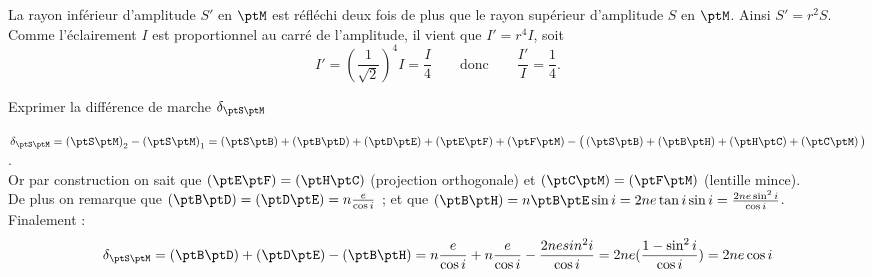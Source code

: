 \reponse{\reponseB{}}

\begin{corrige}
	La rayon inférieur d'amplitude $S'$ en $\ptM$ est réfléchi deux fois de plus que le rayon supérieur d'amplitude $S$ en $\ptM$. Ainsi $S' = r^2 S$. Comme l'éclairement $I$ est proportionnel au carré de l'amplitude, il vient que $I' = r^4 I$, soit
	$$
	I' = \left( \frac{1}{\sqrt{2}} \right)^4 I = \frac{I}{4} \qquad \text{donc} \qquad \frac{I'}{I} = \frac{1}{4}.$$
	
\end{corrige}




\begin{enonce}
Exprimer la différence de marche $\delta_{\ptS\ptM}$
\end{enonce}


\begin{corrige}
$\delta_{\ptS\ptM}=\left(\ptS\ptM\right)_2 - \left(\ptS\ptM\right)_1 = \left(\ptS\ptB\right)+\left(\ptB\ptD\right)+\left(\ptD\ptE\right)+\left(\ptE\ptF\right) + \left(\ptF\ptM\right) - \big( \left(\ptS\ptB\right) + \left(\ptB\ptH\right) + \left(\ptH\ptC\right) + \left(\ptC\ptM\right) \big)$.\\
Or par construction on sait que $\left(\ptE\ptF\right)=\left(\ptH\ptC\right)$ (projection orthogonale) et $\left(\ptC\ptM\right)=\left(\ptF\ptM\right)$ (lentille mince).\\
De plus on remarque que $\left(\ptB\ptD\right)= \left(\ptD\ptE\right) = n\frac{e}{\cos i}$ ; et que $\left(\ptB\ptH\right) = n\ptB\ptE\sin i = 2n e \tan i \sin i = \frac{2ne \sin^2 i}{\cos i}$.\\
Finalement :
\begin{equation*}
	\delta_{\ptS\ptM}= \left(\ptB\ptD\right)+\left(\ptD\ptE\right) - \left(\ptB\ptH\right) = n\frac{e}{\cos i} + n\frac{e}{\cos i} - \frac{2ne sin^2 i}{\cos i} = 2ne (\frac{1-\sin^2 i}{\cos i} ) = 2ne \cos i
\end{equation*} 
\end{corrige}




